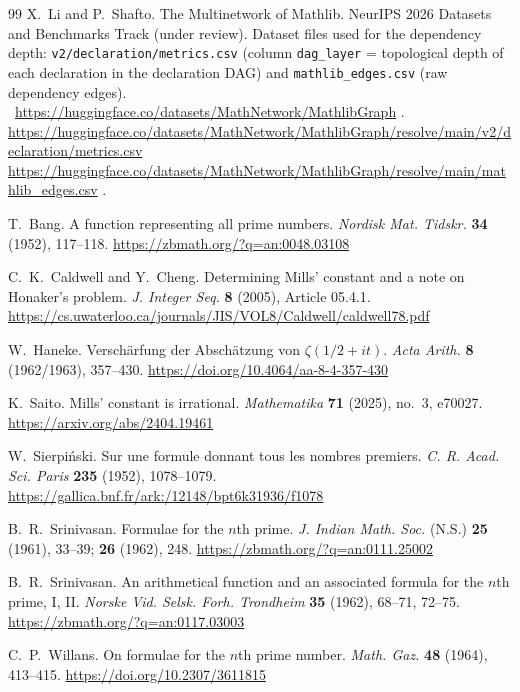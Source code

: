 \documentclass[11pt,reqno]{amsart}
\theoremstyle{redplain}
\numberwithin{equation}{section}
\begin{document}
\begin{thebibliography}{99}
 X.~Li and P.~Shafto. The Multinetwork of Mathlib.
NeurIPS 2026 Datasets and Benchmarks Track (under review). Dataset files
used for the dependency depth: \texttt{v2/declaration/metrics.csv} (column 
\texttt{dag\_layer} = topological depth of each declaration in the
declaration DAG) and \texttt{mathlib\_edges.csv} (raw dependency edges). 
{\scriptsize \ \url{https://huggingface.co/datasets/MathNetwork/MathlibGraph}%
.\newline
\url{https://huggingface.co/datasets/MathNetwork/MathlibGraph/resolve/main/v2/declaration/metrics.csv}%
\newline
\url{https://huggingface.co/datasets/MathNetwork/MathlibGraph/resolve/main/mathlib_edges.csv}%
.}

 T.~Bang. A function representing all prime numbers. \emph{%
Nordisk Mat. Tidskr.} \textbf{34} (1952), 117--118. %
\url{https://zbmath.org/?q=an:0048.03108}

 C.~K.~Caldwell and Y.~Cheng. Determining Mills'
constant and a note on Honaker's problem. \emph{J. Integer Seq.} \textbf{8}
(2005), Article 05.4.1. %
\url{https://cs.uwaterloo.ca/journals/JIS/VOL8/Caldwell/caldwell78.pdf}

 W.~Haneke. Versch\"arfung der Absch\"atzung von $%
\zeta(1/2+it)$. \emph{Acta Arith.} \textbf{8} (1962/1963), 357--430. %
\url{https://doi.org/10.4064/aa-8-4-357-430}

 K.~Saito. Mills' constant is irrational. \emph{%
Mathematika} \textbf{71} (2025), no.~3, e70027. %
\url{https://arxiv.org/abs/2404.19461}

 W.~Sierpi\'nski. Sur une formule donnant tous les
nombres premiers. \emph{C. R. Acad. Sci. Paris} \textbf{235} (1952),
1078--1079. \url{https://gallica.bnf.fr/ark:/12148/bpt6k31936/f1078}

 B.~R.~Srinivasan. Formulae for the $n$th prime. 
\emph{J. Indian Math. Soc.} (N.S.) \textbf{25} (1961), 33--39; \textbf{26}
(1962), 248. \url{https://zbmath.org/?q=an:0111.25002}

 B.~R.~Srinivasan. An arithmetical function and an
associated formula for the $n$th prime, I, II. \emph{Norske Vid. Selsk.
Forh. Trondheim} \textbf{35} (1962), 68--71, 72--75. %
\url{https://zbmath.org/?q=an:0117.03003}

 C.~P.~Willans. On formulae for the $n$th prime number. 
\emph{Math. Gaz.} \textbf{48} (1964), 413--415. %
\url{https://doi.org/10.2307/3611815}
\end{thebibliography}
\end{document}
